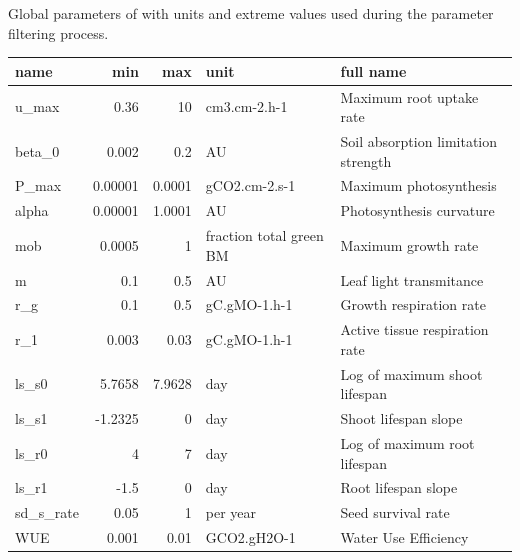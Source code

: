 \begin{table2*}
\centering
\caption[Parameters of \model]{Global parameters of \model with units and extreme values used during the parameter filtering process.}
\label{table:priors}
\begin{tabular}{lrrll}
name        & min     & max    & unit                         & full name                                         \\ \hline
u\_max      & 0.36    & 10     & cm3.cm-2.h-1                 & Maximum root uptake rate                           \\
beta\_0     & 0.002   & 0.2    & AU        		              & Soil absorption limitation strength                \\
P\_max      & 0.00001 & 0.0001 & gCO2.cm-2.s-1                & Maximum photosynthesis                             \\
alpha       & 0.00001 & 1.0001 & AU                           & Photosynthesis curvature                           \\
mob         & 0.0005  & 1      & fraction total green BM	  & Maximum growth rate                                \\
m           & 0.1     & 0.5    & AU                           & Leaf light transmitance                            \\
r\_g        & 0.1     & 0.5    & gC.gMO-1.h-1                 & Growth respiration rate                            \\
r\_1        & 0.003   & 0.03   & gC.gMO-1.h-1                 & Active tissue respiration rate                     \\
ls\_s0      & 5.7658  & 7.9628 & day                          & Log of maximum shoot lifespan                      \\
ls\_s1      & -1.2325 & 0      & day                          & Shoot lifespan slope                               \\
ls\_r0      & 4       & 7      & day                          & Log of maximum root lifespan                       \\
ls\_r1      & -1.5    & 0      & day                          & Root lifespan slope                                \\
sd\_s\_rate & 0.05    & 1      & per year                     & Seed survival rate                                 \\
WUE         & 0.001   & 0.01   & GCO2.gH2O-1                  & Water Use Efficiency                               \\

\end{tabular}
\end{table2*}
